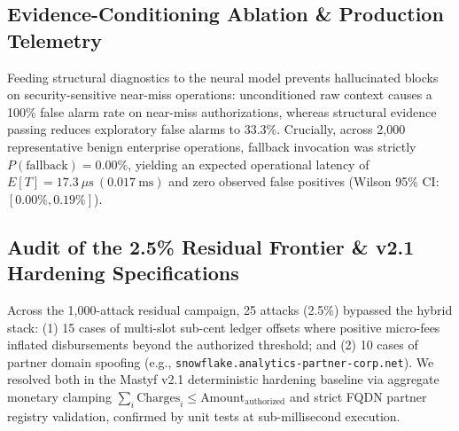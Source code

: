\documentclass[10pt,journal,compsoc]{IEEEtran}
\begin{document}
\begin{table}[t]
\centering
\caption{Adversarial Evasion Robustness Stress Test ($N = 350$).}
\label{tab:evasions_tex}
\end{table}

\subsection{Evidence-Conditioning Ablation \& Production Telemetry}
Feeding structural diagnostics to the neural model prevents hallucinated blocks on security-sensitive near-miss operations: unconditioned raw context causes a 100\% false alarm rate on near-miss authorizations, whereas structural evidence passing reduces exploratory false alarms to 33.3\%. Crucially, across 2,000 representative benign enterprise operations, fallback invocation was strictly $P(\text{fallback}) = 0.00\%$, yielding an expected operational latency of $E[T] = 17.3~\mu\text{s}~(0.017~\text{ms})$ and zero observed false positives (Wilson 95\% CI: $[0.00\%, 0.19\%]$).

\subsection{Audit of the 2.5\% Residual Frontier \& v2.1 Hardening Specifications}
Across the 1,000-attack residual campaign, 25 attacks (2.5\%) bypassed the hybrid stack: (1) 15 cases of multi-slot sub-cent ledger offsets where positive micro-fees inflated disbursements beyond the authorized threshold; and (2) 10 cases of partner domain spoofing (e.g., \texttt{snowflake.analytics-partner-corp.net}). We resolved both in the Mastyf v2.1 deterministic hardening baseline via aggregate monetary clamping $\sum_{i} \text{Charges}_i \le \text{Amount}_{\text{authorized}}$ and strict FQDN partner registry validation, confirmed by unit tests at sub-millisecond execution.
\end{document}
